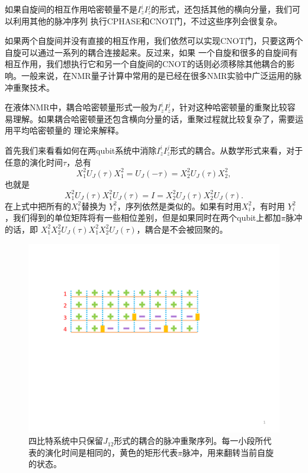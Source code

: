 如果自旋间的相互作用哈密顿量不是$I_z^iI_z^j$的形式，还包括其他的横向分量，我们可以利用其他的脉冲序列
执行CPHASE和CNOT门，不过这些序列会很复杂\cite{linecnot2}。

如果两个自旋间并没有直接的相互作用，我们依然可以实现CNOT门，只要这两个自旋可以通过一系列的耦合连接起来。反过来，如果
一个自旋和很多的自旋间有相互作用，我们想执行它和另一个自旋间的CNOT的话则必须移除其他耦合的影响。一般来说，在NMR量子计算中常用的是已经在很多NMR实验中广泛运用的脉冲重聚技术。

在液体NMR中，耦合哈密顿量形式一般为$I_z^iI_z^j$，针对这种哈密顿量的重聚比较容易理解。如果耦合哈密顿量还包含横向分量的话，重聚过程就比较复杂了，需要运用平均哈密顿量的
理论来解释。

首先我们来看看如何在两qubit系统中消除$I_z^iI_z^j$形式的耦合。从数学形式来看，对于任意的演化时间$\tau$，总有
\begin{equation}\label{aaa}
X_1^2U_J(\tau)X_1^2 =U_J(-\tau) =X_2^2U_J(\tau)X_2^2,
\end{equation}
也就是
\begin{equation}\label{aaa}
X_1^2U_J(\tau)X_1^2U_J(\tau) =I=X_2^2U_J(\tau)X_2^2U_J(\tau).
\end{equation}
在上式中把所有的$X_i^2$替换为 $Y_i^2$，序列依然是类似的。如果有时用$X_i^2$，有时用 $Y_i^2$，我们得到的单位矩阵将有一些相位差别，但是如果同时在两个qubit上都加$\pi$脉冲的话，即
$X_1^2X_2^2U_J(\tau)X_1^2X_2^2U_J(\tau) $，耦合是不会被回聚的。

\begin{figure}[htbp]
            \begin{center}
              \includegraphics[width= 0.8\columnwidth]{figures/refocusing.pdf}
              \caption{四比特系统中只保留$J_{12}$形式的耦合的脉冲重聚序列。每一小段所代表的演化时间是相同的，黄色的矩形代表$\pi$脉冲，用来翻转当前自旋的状态。
              }
              \label{refocusing}
            \end{center}
\end{figure}

